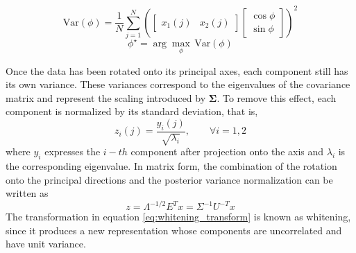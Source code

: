 \begin{equation}
\mathrm{Var}(\phi)=\frac{1}{N}\sum_{j=1}^{N}
\left(
\begin{bmatrix}
x_1(j) & x_2(j)
\end{bmatrix}
\begin{bmatrix}
\cos\phi\\
\sin\phi
\end{bmatrix}
\right)^2
\label{eq:var_phi}
\end{equation}
\begin{equation}
\phi^\star = \arg\max_{\phi}\,\mathrm{Var}(\phi)
\label{eq:phi_star}
\end{equation}

Once the data has been rotated onto its principal axes, each component still has its own variance. These variances correspond to the eigenvalues of the covariance matrix and represent the scaling introduced by $\mathbf{\Sigma}$.  To remove this effect, each component is normalized by its standard deviation, that is, 
\begin{equation}
    z_i(j)=\frac{y_i(j)}{\sqrt{\lambda_i}}, \qquad \forall i=1,2 
\end{equation}
\noindent where $y_i$ expresses the $i-th$ component after projection onto the axis and $\lambda_i $ is the corresponding eigenvalue. In matrix form, the combination of the rotation onto the principal directions and the posterior variance normalization can be written as
\begin{equation}
    z= \Lambda^{-1/2}E^T x = \Sigma^{-1}U^{-T}x
    \label{eq:whitening_transform}
\end{equation}
The transformation in equation \eqref{eq:whitening_transform} is known as whitening, since it produces a new representation whose components are uncorrelated and have unit variance.


